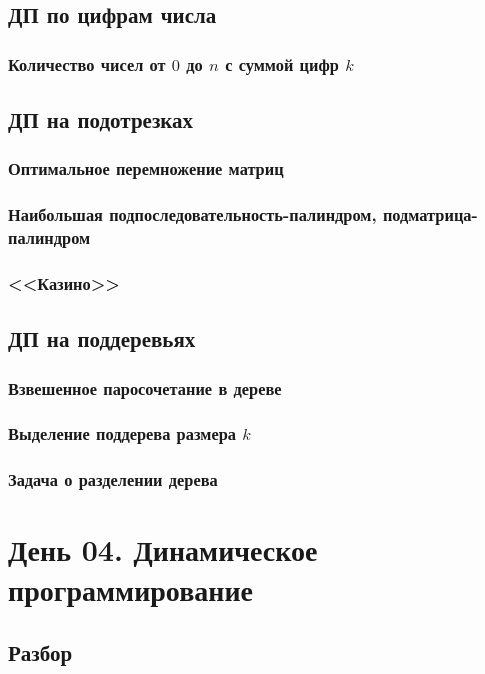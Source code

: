 \documentclass[a4paper,12pt]{article}
\begin{document}
      \subsection{ДП по цифрам числа}
        \subsubsection{Количество чисел от $0$ до $n$ с суммой цифр $k$}

      \subsection{ДП на подотрезках}
        \subsubsection{Оптимальное перемножение матриц}
        \subsubsection{Наибольшая подпоследовательность-палиндром,
          подматрица-палиндром}
        \subsubsection{<<Казино>>}

      \subsection{ДП на поддеревьях}
        \subsubsection{Взвешенное паросочетание в дереве}
        \subsubsection{Выделение поддерева размера $k$}
        \subsubsection{Задача о разделении дерева}

  \newpage

  \section{День 04. Динамическое программирование}

    \subsection{Разбор}
\end{document}
